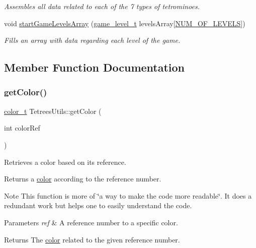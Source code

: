 \begin{DoxyCompactItemize}
\begin{DoxyCompactList}\small\item\em Assembles all data related to each of the 7 types of tetrominoes. \end{DoxyCompactList}\item 
void \hyperlink{classTetreesUtils_a1bbb7dbec571bf3490fd74fcdacc7640}{start\+Game\+Levels\+Array} (\hyperlink{structgame__level__t}{game\+\_\+level\+\_\+t} levels\+Array\mbox{[}\hyperlink{TetreesDefs_8hpp_a350a4204247d3562e237e289533cc31f}{N\+U\+M\+\_\+\+O\+F\+\_\+\+L\+E\+V\+E\+LS}\mbox{]})
\begin{DoxyCompactList}\small\item\em Fills an array with data regarding each level of the game. \end{DoxyCompactList}\end{DoxyCompactItemize}


\subsection{Member Function Documentation}
\mbox{\label{classTetreesUtils_a812d9a7bee07fef5dfcec1fd36c4b502}} 
\subsubsection{\texorpdfstring{get\+Color()}{getColor()}}
{\footnotesize\ttfamily \hyperlink{TetreesDefs_8hpp_a8ba5fbce2446135735693ab60c896bbd}{color\+\_\+t} Tetrees\+Utils\+::get\+Color (\begin{DoxyParamCaption}\item[{int}]{color\+Ref }\end{DoxyParamCaption})}



Retrieves a color based on its reference. 

Returns a \hyperlink{TetreesDefs_8hpp_a8ba5fbce2446135735693ab60c896bbd}{color} according to the reference number. \begin{DoxyNote}{Note}
This function is more of \char`\"{}a way to make the code more readable\char`\"{}. It does a redundant work but helps one to easily understand the code. 
\end{DoxyNote}

\begin{DoxyParams}{Parameters}
{\em ref} & A reference number to a specific color. \\
\hline
\end{DoxyParams}
\begin{DoxyReturn}{Returns}
The \hyperlink{TetreesDefs_8hpp_a8ba5fbce2446135735693ab60c896bbd}{color} related to the given reference number. 
\end{DoxyReturn}
\mbox{\label{classTetreesUtils_ad6ece1c845969a3535b8a6d971d8ddcb}} 
